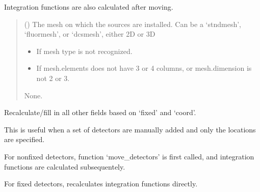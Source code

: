 \documentclass[letterpaper,10pt,english]{sphinxmanual}
\begin{document}
\begin{fulllineitems}
\begin{fulllineitems}
\sphinxAtStartPar
Integration functions are also calculated after moving.
\begin{quote}\begin{description}
\sphinxAtStartPar
{} () \textendash{} The mesh on which the sources are installed. Can be a ‘stndmesh’, ‘fluormesh’, or ‘dcsmesh’, either 2D or 3D

\begin{itemize}
\item {} 
\sphinxAtStartPar
{} \textendash{} If mesh type is not recognized.

\item {} 
\sphinxAtStartPar
{} \textendash{} If mesh.elements does not have 3 or 4 columns, or mesh.dimension is not 2 or 3.

\end{itemize}

\sphinxAtStartPar
None.

\end{description}\end{quote}

\end{fulllineitems}


\begin{fulllineitems}
\label{\detokenize{_autosummary/nirfasterff.base.optodes.optode:nirfasterff.base.optodes.optode.touch_detectors}}
\pysigstartsignatures
\pysiglinewithargsret
{}
{}
{}
\pysigstopsignatures
\sphinxAtStartPar
Recalculate/fill in all other fields based on ‘fixed’ and ‘coord’.

\sphinxAtStartPar
This is useful when a set of detectors are manually added and only the locations are specified.

\sphinxAtStartPar
For non\sphinxhyphen{}fixed detectors, function ‘move\_detectors’ is first called, and integration functions are calculated subsequentely.

\sphinxAtStartPar
For fixed detectors, recalculates integration functions directly.


\end{fulllineitems}
\end{fulllineitems}
\end{document}
